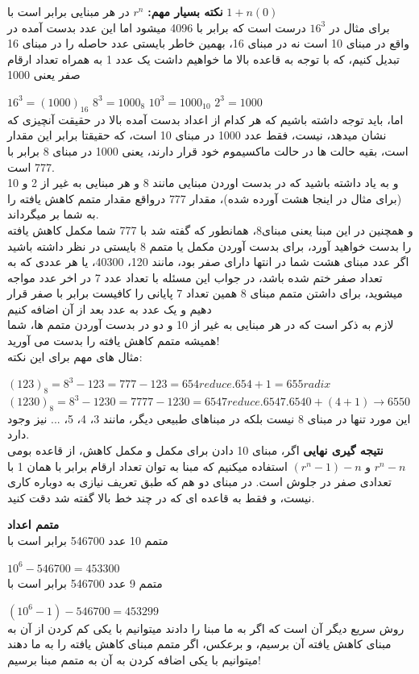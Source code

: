 \documentclass[pt, a5paper]{article}
\begin{document}
\textbf{نکته بسیار مهم:}
$r^{n}$
در هر مبنایی برابر است با
$1+n(0)$\\


برای مثال در
$16^{3}$
درست است که برابر با 4096 میشود اما این عدد بدست آمده در واقع در مبنای 10 است نه در مبنای 16، بهمین خاطر بایستی عدد حاصله را در مبنای 16 تبدیل کنیم، که با توجه به قاعده بالا ما خواهیم داشت یک عدد 1 به همراه تعداد ارقام صفر یعنی 1000\\
\raggedright
$16^{3} = (1000)_{16}$
$8^{3} = 1000_{8}$
$10^{3} = 1000_{10}$
$2^{3} = 1000$\\
\justifying
اما، باید توجه داشته باشیم که هر کدام از اعداد بدست آمده بالا در حقیقت آنچیزی که نشان میدهد، نیست، فقط عدد 1000 در مبنای 10 است، که حقیقتا برابر این مقدار است، بقیه حالت ها در حالت ماکسیموم خود قرار دارند، یعنی 1000 در مبنای 8 برابر با 777 است.\\
و به یاد داشته باشید که در بدست اوردن مبنایی مانند 8 و هر مبنایی به غیر از 2 و 10 (برای مثال در اینجا هشت آورده شده)، مقدار 777 درواقع مقدار متمم کاهش یافته را به شما بر میگرداند.\\
و همچنین در این مبنا یعنی مبنای8، همانطور که گفته شد با 777 شما مکمل کاهش یافته را بدست خواهید آورد، برای بدست آوردن مکمل یا متمم 8 بایستی در نظر داشته باشید اگر عدد مبنای هشت شما در انتها دارای صفر بود، مانند 120، 40300، یا هر عددی که به تعداد صفر ختم شده باشد، در جواب این مسئله با تعداد عدد 7 در اخر عدد مواجه میشوید، برای داشتن متمم مبنای 8 همین تعداد 7 پایانی را کافیست برابر با صفر قرار دهیم و یک عدد به عدد بعد از آن اضافه کنیم\\
لازم به ذکر است که در هر مبنایی به غیر از 10 و دو در بدست آوردن متمم ها، شما همیشه متمم کاهش یافته را بدست می آورید!\\
مثال های مهم برای این نکته:\raggedleft
\raggedright

$(123)_8 = 8^{3} - 123 = 777 - 123 = 654 reduce. 654 + 1 = 655 radix$\\
$(1230)_8 = 8^{3} - 1230 = 7777 - 1230 = 6547 reduce. 6547. 6540 + (4+1) \rightarrow 6550 $\\
\justifying
این مورد تنها در مبنای 8 نیست بلکه در مبناهای طبیعی دیگر، مانند 3، 4، 5، ... نیز وجود دارد.\\
\textbf{نتیجه گیری نهایی}
اگر، مبنای 10 دادن برای مکمل و مکمل کاهش، از قاعده بومی
$r^{n}-n$
و
$(r^{n}-1)-n$
استفاده میکنیم که مبنا به توان تعداد ارقام برابر با همان 1 با تعدادی صفر در جلوش است. در مبنای دو هم که طبق تعریف نیازی به دوباره کاری نیست، و فقط به قاعده ای که در چند خط بالا گفته شد دقت کنید.

\textbf{متمم اعداد}\\
\raggedleft
متمم 10 عدد 546700 برابر است با\\
\raggedright
$10^{6} - 546700 = 453300$\\ 
\raggedleft
متمم 9 عدد 546700 برابر است با\\
\raggedright
$(10^{6} - 1) - 546700 = 453299$\\
\raggedleft
روش سریع دیگر آن است که اگر به ما مبنا را دادند میتوانیم با یکی کم کردن از آن به مبنای کاهش یافته آن برسیم، و برعکس، اگر متمم مبنای کاهش یافته را به ما دهند میتوانیم با یکی اضافه کردن به آن به متمم مبنا برسیم!\\
\end{document}
